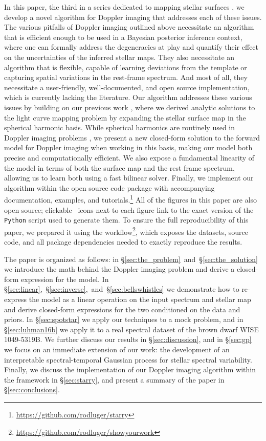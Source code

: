 \documentclass[modern]{aastex631}
\begin{document}
In this paper, the third in a series dedicated to mapping stellar surfaces \citep{Luger2021a,Luger2021b}, we develop a novel algorithm for Doppler imaging that addresses each of these issues.
The various pitfalls of Doppler imaging outlined above necessitate an algorithm that is efficient enough to be used in a Bayesian posterior inference context, where one can formally address the degeneracies at play and quantify their effect on the uncertainties of the inferred stellar maps.
They also necessitate an algorithm that is flexible, capable of learning deviations from the template or capturing spatial variations in the rest-frame spectrum.
And most of all, they necessitate a user-friendly, well-documented, and open source implementation, which is currently lacking the literature.
Our algorithm addresses these various issues by building on our previous work \citep{Luger2019}, where we derived analytic solutions to the light curve mapping problem by expanding the stellar surface map in the spherical harmonic basis.
While spherical harmonics are routinely used in Doppler imaging problems \citep{Deutsch1958,Deutsch1970,Falk1974,Donati2006,Kochukhov2014}, we present a new closed-form solution to the forward model for Doppler imaging when working in this basis, making our model both precise and computationally efficient.
We also expose a fundamental linearity of the model in terms of both the surface map and the rest frame spectrum, allowing us to learn both using a fast bilinear solver.
Finally, we implement our algorithm within the open source \starry code package with accompanying documentation, examples, and tutorials.\footnote{\url{https://github.com/rodluger/starry}}
All of the figures in this paper are also open source; clickable \faGithub\, icons next to each figure link to the exact version of the \texttt{Python} script used to generate them.
To ensure the full reproducibility of this paper, we prepared it using the \showyourwork workflow\footnote{\url{https://github.com/rodluger/showyourwork}}, which exposes the datasets, source code, and all package dependencies needed to exactly reproduce the results.

The paper is organized as follows: in \S\ref{sec:the_problem}~and~\S\ref{sec:the_solution} we introduce the math behind the Doppler imaging problem and derive a closed-form expression for the model. 
In \S\ref{sec:linear},~\S\ref{sec:inverse},~and~\S\ref{sec:bellswhistles} we demonstrate how to re-express the model as a linear operation on the input spectrum and stellar map and derive closed-form expressions for the two conditioned on the data and priors.
In \S\ref{sec:spotstar} we apply our techniques to a mock problem, and in \S\ref{sec:luhman16b} we apply it to a real spectral dataset of the brown dwarf WISE 1049-5319B.
We further discuss our results in \S\ref{sec:discussion}, and in \S\ref{sec:gp} we focus on an immediate extension of our work: the development of an interpretable spectral-temporal Gaussian process for stellar spectral variability.
Finally, we discuss the implementation of our Doppler imaging algorithm within the \starry framework in \S\ref{sec:starry}, and present a summary of the paper in \S\ref{sec:conclusions}. 
\end{document}

